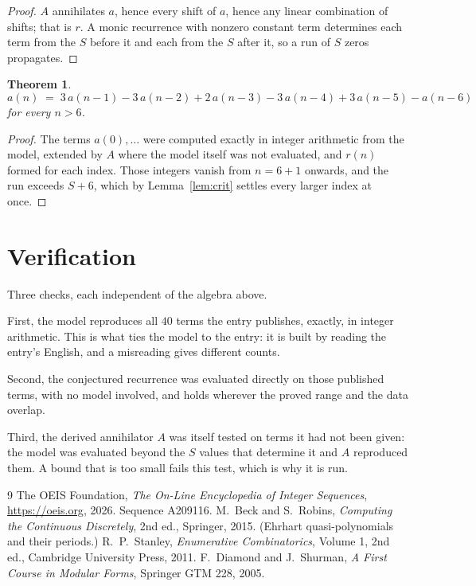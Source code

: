 \documentclass[11pt,a4paper]{article}
\theoremstyle{plain}
\newtheorem{theorem}{Theorem}
\theoremstyle{definition}
\begin{document}
\begin{proof}
$A$ annihilates $a$, hence every shift of $a$, hence any linear combination of shifts; that is
$r$. A monic recurrence with nonzero constant term determines each term from the $S$ before it
and each from the $S$ after it, so a run of $S$ zeros propagates.
\end{proof}

\begin{theorem}
\[
a(n)\;=\;3\,a(n-1) - 3\,a(n-2) + 2\,a(n-3) - 3\,a(n-4) + 3\,a(n-5) - a(n-6)
\]
for every $n>6$.
\end{theorem}

\begin{proof}
The terms $a(0),\dots$ were computed exactly in integer arithmetic from the model, extended by
$A$ where the model itself was not evaluated, and $r(n)$ formed for each index. Those integers
vanish from $n=6+1$ onwards, and the run exceeds $S+6$, which by
Lemma~\ref{lem:crit} settles every larger index at once.
\end{proof}

\section{Verification}

Three checks, each independent of the algebra above.

First, the model reproduces all $40$ terms the entry publishes, exactly, in integer
arithmetic. This is what ties the model to the entry: it is built by reading the entry's
English, and a misreading gives different counts.

Second, the conjectured recurrence was evaluated directly on those published terms, with no
model involved, and holds wherever the proved range and the data overlap.

Third, the derived annihilator $A$ was itself tested on terms it had not been given: the model
was evaluated beyond the $S$ values that determine it and $A$ reproduced them. A bound that is
too small fails this test, which is why it is run.

\begin{thebibliography}{9}
 The OEIS Foundation, \emph{The On-Line Encyclopedia of Integer
Sequences}, \url{https://oeis.org}, 2026. Sequence A209116.
 M.~Beck and S.~Robins, \emph{Computing the Continuous Discretely},
2nd ed., Springer, 2015. (Ehrhart quasi-polynomials and their periods.)
 R.~P.~Stanley, \emph{Enumerative Combinatorics}, Volume 1, 2nd ed.,
Cambridge University Press, 2011.
 F.~Diamond and J.~Shurman, \emph{A First Course in Modular Forms},
Springer GTM 228, 2005.
\end{thebibliography}
\end{document}

